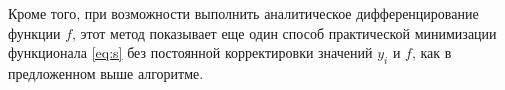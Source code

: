 \documentclass[11pt,a4paper]{article}
\begin{document}
Кроме того, при возможности выполнить аналитическое дифференцирование функции $f$, этот
метод показывает еще один способ практической минимизации функционала \eqref{eq:s} без
постоянной корректировки значений $y_i$ и $f$, как в предложенном выше алгоритме.

\FloatBarrier


%
%

\end{document}
